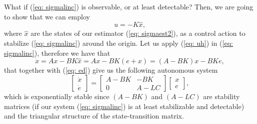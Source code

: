 What if (\ref{eq: sigmalinc}) is observable, or at least detectable? Then, we are going to show that we can employ
\begin{equation}
	u = -K \hat x, \label{eq: uh}
\end{equation}
where $\hat x$ are the states of our estimator (\ref{eq: sigmaest2}), as a control action to stabilize (\ref{eq: sigmalinc}) around the origin. Let us apply (\ref{eq: uh}) in (\ref{eq: sigmalinc}), therefore we have that
\begin{equation}
	\dot x = Ax - BK\hat x = Ax - BK(e + x) = (A -BK)x -BKe,
\end{equation}
that together with (\ref{eq: ed}) give us the following autonomous system
\begin{equation}
	\begin{bmatrix}\dot x \\ \dot e\end{bmatrix} = \begin{bmatrix}A-BK & -BK \\ 0 & A-LC\end{bmatrix}\begin{bmatrix}x \\ e\end{bmatrix},
\end{equation}
which is exponentially stable since $(A-BK)$ and $(A-LC)$ are stability matrices (if our system (\ref{eq: sigmalinc}) is at least stabilizable and detectable) and the triangular structure of the state-transition matrix.


